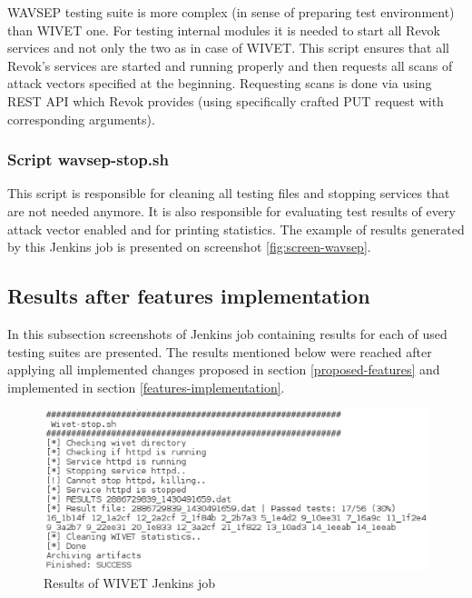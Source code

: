 			WAVSEP testing suite is more complex (in sense of preparing test environment) than WIVET one. For testing internal modules it is needed to start all Revok services and not only the two as in case of WIVET. This script ensures that all Revok's services are started and running properly and then requests all scans of attack vectors specified at the beginning. Requesting scans is done via using REST API which Revok provides (using specifically crafted PUT request with corresponding arguments).
			
			\subsubsection{Script wavsep-stop.sh}
			
			This script is responsible for cleaning all testing files and stopping services that are not needed anymore. It is also responsible for evaluating test results of every attack vector enabled and for printing statistics. The example of results generated by this Jenkins job is presented on screenshot \ref{fig:screen-wavsep}.
			
		\subsection{Results after features implementation}		
		
		In this subsection screenshots of Jenkins job containing results for each of used testing suites are presented. The results mentioned below were reached after applying all implemented changes proposed in section \ref{proposed-features} and implemented in section \ref{features-implementation}.
		
		\begin{figure}[h!]
		  \centering
		  \includegraphics[width=13cm]{fig/jenkins_wivet.eps}
		  \caption{Results of WIVET Jenkins job}
		  \label{fig:screen-wivet}
		\end{figure}
	
